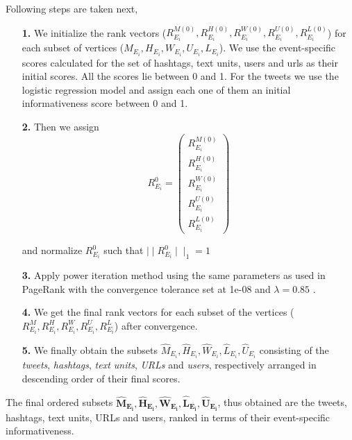 Following steps are taken next,
\begin{itemize}
\item[\textbf{1.}] We initialize the rank vectors ($ R_{{E_{i}}}^{M(0)}, R_{{E_{i}}}^{H(0)}, R_{{E_{i}}}^{W(0)}, R_{{E_{i}}}^{U(0)}, R_{{E_{i}}}^{L(0)}$) for each subset of vertices ($M_{E_{i}}, H_{E_{i}}, W_{E_{i}}, U_{E_{i}}, L_{E_{i}}$). We use the event-specific scores calculated for the set of hashtags, text units, users and urls as their initial scores. All the scores lie between 0 and 1. For the tweets we use the logistic regression model and assign each one of them an initial informativeness score between 0 and 1.

\item[\textbf{2.}] Then we assign
\[ R_{E_{i}}^{0} = \left( \begin{array}{c}
R_{{E_{i}}}^{M(0)} \\
R_{{E_{i}}}^{H(0)} \\
R_{{E_{i}}}^{W(0)} \\
R_{{E_{i}}}^{U(0)} \\
R_{{E_{i}}}^{L(0)} \end{array} \right)\] 

and normalize $R_{E_{i}}^{0}$ such that $\mid \mid R_{E_{i}}^{0}\mid \mid_{1} = 1$

\item[\textbf{3.}] Apply power iteration method using the same parameters as used in PageRank with the convergence tolerance set at 1e-08 and $\lambda = 0.85$ .

\item[\textbf{4.}] We get the final rank vectors for each subset of the vertices ($R_{{E_{i}}}^{M}, R_{{E_{i}}}^{H}, R_{{E_{i}}}^{W}, R_{{E_{i}}}^{U}, R_{{E_{i}}}^{L}$) after convergence. 

\item[\textbf{5.}] We finally obtain the subsets $\hat{M}_{E_{i}}, \hat{H}_{E_{i}}, \hat{W}_{E_{i}}, \hat{L}_{E_{i}}, \hat{U}_{E_{i}}$ consisting of the \textit{tweets}, \textit{hashtags}, \textit{text units}, \textit{URLs} and \textit{users}, respectively arranged in descending order of their final scores.

\end{itemize}

The final ordered subsets $\scriptstyle \mathbf{\hat{M}_{E_{i}}, \hat{H}_{E_{i}}, \hat{W}_{E_{i}}, \hat{L}_{E_{i}}, \hat{U}_{E_{i}}}$,  thus obtained are the tweets, hashtags, text units, URLs and users, ranked in terms of their event-specific informativeness. 

